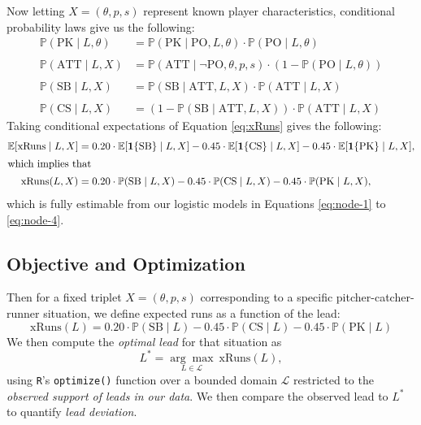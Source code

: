 \documentclass[12pt,letterpaper]{article}
\newcommand{\E}{\mathbb{E}}
\renewcommand{\P}{\mathbb{P}}
\begin{document}
Now letting $X = (\theta, p, s)$ represent known player characteristics, conditional probability laws give us the following:
\begin{align*}
    \P(\text{PK}\mid L, \theta) &= \P(\text{PK}\mid \text{PO}, L, \theta)\cdot \P(\text{PO}\mid L, \theta) \\ \nonumber \\
    \P(\text{ATT} \mid L, X) &= \P(\text{ATT} \mid \neg\text{PO}, \theta, p, s) \cdot(1-\P(\text{PO} \mid L, \theta)) \\ \nonumber \\
    \P(\text{SB} \mid L, X) &= \P(\text{SB} \mid \text{ATT}, L, X)\cdot\P(\text{ATT}\mid L,X) \\ \nonumber \\
    \P(\text{CS} \mid L, X) &= (1 - \P(\text{SB} \mid \text{ATT}, L, X))\cdot \P(\text{ATT} \mid L,X)
\end{align*}
Taking conditional expectations of Equation \ref{eq:xRuns} gives the following:
\begin{align} 
    \E[\text{xRuns} \mid L, X] &= 0.20 \cdot \E[\mathbf{1}\{\text{SB}\} \mid L, X] - 0.45 \cdot \E[\mathbf{1}\{\text{CS}\} \mid L, X] - 0.45 \cdot \E[\mathbf{1}\{\text{PK}\}\mid L,X], \nonumber \\
    \intertext{which implies that}
    \text{xRuns}(L, X)&=0.20 \cdot \P(\text{SB} \mid L,X) -0.45 \cdot \P(\text{CS} \mid L, X) -0.45 \cdot \P(\text{PK} \mid L, X), \label{eq:xRuns-estimable}
\end{align}
which is fully estimable from our logistic models in Equations \ref{eq:node-1} to \ref{eq:node-4}.

\subsection{Objective and Optimization}

Then for a fixed triplet $X = (\theta, p, s)$ corresponding to a specific pitcher-catcher-runner situation, we define expected runs as a function of the lead:
\begin{equation}
    \text{xRuns}(L) = 0.20 \cdot \P(\text{SB} \mid L) - 0.45 \cdot \P(\text{CS} \mid L) - 0.45 \cdot \P(\text{PK} \mid L)
\end{equation}
We then compute the \emph{optimal lead} for that situation as
\begin{equation}
    L^* = \underset{L\in \mathcal{L}}{\arg\max}\ \text{xRuns}(L), \label{eq:optimization}
\end{equation}
using \texttt{R}'s \texttt{optimize()} function over a bounded domain $\mathcal{L}$ restricted to the \emph{observed support of leads in our data}. We then compare the observed lead to $L^*$ to quantify \emph{lead deviation}.
\end{document}
